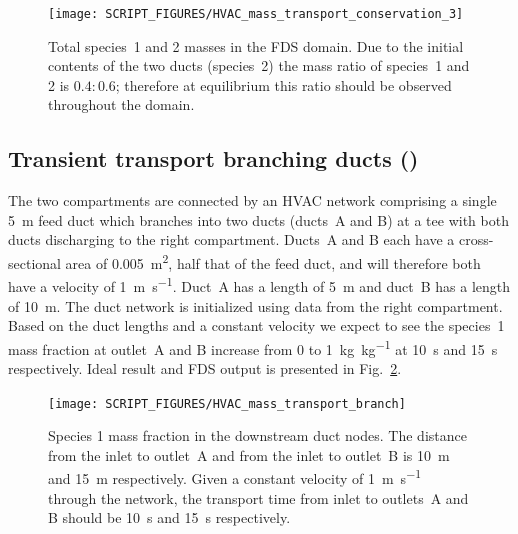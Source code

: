 \documentclass[11pt]{book}
\begin{document}
\begin{figure}[ht]
\centering
\texttt{[image: SCRIPT\_FIGURES/HVAC\_mass\_transport\_conservation\_3]}
\caption[ test case]{Total species~1 and 2 masses in the FDS domain. Due to the initial contents of the two ducts (species~2) the mass ratio of species~1 and 2 is \(0.4 \colon 0.6\); therefore at equilibrium this ratio should be observed throughout the domain.}
\label{fig_HVAC_mass_transport_conservation_3}
\end{figure}

\subsection{Transient transport branching ducts (\texorpdfstring{}{HVAC\_mass\_transport\_branch})}
\label{HVAC_mass_transport_branch}
The two compartments are connected by an HVAC network comprising a single \SI{5}{\meter} feed duct which branches into two ducts (ducts~A and B) at a tee with both ducts discharging to the right compartment. Ducts~A and B each have a cross-sectional area of \SI{0.005}{\meter\squared}, half that of the feed duct, and will therefore both have a velocity of \SI[per-mode=symbol]{1}{\meter\per\second}. Duct~A has a length of \SI{5}{\meter} and duct~B has a length of \SI{10}{\meter}. The duct network is initialized using data from the right compartment. Based on the duct lengths and a constant velocity we expect to see the species~\num{1} mass fraction at outlet~A and B increase from \num{0} to \SI[per-mode=symbol]{1}{\kilogram\per\kilogram} at \SI{10}{\second} and \SI{15}{\second} respectively. Ideal result and FDS output is presented in Fig.~\ref{fig_HVAC_mass_transport_branch}.

\begin{figure}[ht]
\centering
\texttt{[image: SCRIPT\_FIGURES/HVAC\_mass\_transport\_branch]}
\caption[ test case]{Species \num{1} mass fraction in the downstream duct nodes. The distance from the inlet to outlet~A and from the inlet to outlet~B is \SI{10}{\meter} and \SI{15}{\meter} respectively. Given a constant velocity of \SI[per-mode=symbol]{1}{\meter\per\second} through the network, the transport time from inlet to outlets~A and B should be \SI{10}{\second} and \SI{15}{\second} respectively.}
\label{fig_HVAC_mass_transport_branch}
\end{figure}
\end{document}
